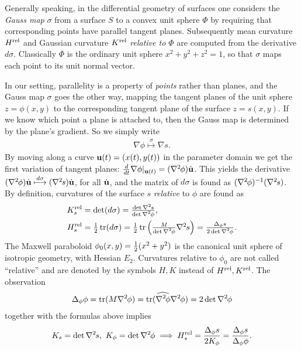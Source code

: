 \documentclass[review]{acmsiggraph}
\def\wh{\widehat}
\def\tr{\mathop{{\rm tr}}\nolimits}
\def\rel{{\mathord{{\rm rel}}}}
\def\ess{s}
\def\Hess#1{{\def\testess{#1}\nabla^2\ifx\testess\ess\!s\else #1\fi}}
\def\Hess#1{\text{$\nabla^2\hskip-.2ex #1$}}
\begin{document}
Generally speaking, in the differential geometry of surfaces one considers
the {\em Gauss map} $\sigma$ from a surface $S$ to a convex unit sphere
$\Phi$ by requiring that corresponding points have parallel tangent
planes.  Subsequently mean curvature $H^\rel$ and Gaussian curvature
$K^\rel$ {\em relative to $\Phi$} are computed from the derivative
$d\sigma$. Classically $\Phi$ is the ordinary unit sphere $x^2+y^2+z^2=1$,
so that $\sigma$ maps each point to its unit normal vector.



In our setting, parallelity is a property of {\em points} rather than
planes, and the Gauss map $\sigma$ goes the other way, mapping the tangent
planes of the unit sphere $z=\phi(x,y)$ to the corresponding tangent plane
of the surface $z=s(x,y)$. If we know which point a plane is attached to,
then the Gauss map is determined by the plane's gradient. So we simply write
	\begin{align*}
	\nabla \phi\overset\sigma\longmapsto\nabla s.
	\end{align*}
 By moving along a curve ${\mathbf u}(t)=(x(t),y(t))$ in the parameter domain we
get the first variation of tangent planes:
	$
	{d\over dt}\nabla \phi|_{\uw(t)} =
	(\Hess\phi)\dot\uw
	$.
 This yields the derivative
	$	
	(\Hess\phi)\dot\uw \overset{d\sigma}\longmapsto
	(\Hess s)\dot\uw $,
 for all $\dot{{\mathbf u}}$, and the matrix of $d\sigma$ is found as
$(\Hess\phi)^{-1}(\Hess s)$.  By definition, curvatures of the surface $s$
{\em relative} to $\phi$ are found as
	\begin{align*}
		K_s^\rel
	& = \textstyle
		\det(d\sigma) =
		{\det\Hess s \over \det\Hess\phi} ,
	\\
		H_s^\rel
	&= \textstyle
		{1\over 2}\tr(d\sigma)
		= {1\over 2}\tr \left({M\over\det\Hess\phi} \Hess s\right)
		=  {\Delta_\phi s \over 2\det\Hess\phi}.
	\end{align*}
 The Maxwell paraboloid $\phi_0(x,y)={1\over 2}(x^2+y^2)$ is the canonical
unit sphere of isotropic geometry, with Hessian $E_2$. Curvatures
relative to $\phi_0$ are not called ``relative'' and are denoted by the
symbols $H,K$ instead of $H^\rel,K^\rel$. The observation
	\begin{align*}
	\Delta_\phi \phi
	= \tr(M \Hess \phi)
	= \tr(\wh{\Hess\phi}\Hess\phi)
	= 2\det\Hess\phi
	\end{align*}
 together with the formulas above implies
	\begin{align*}
		K_s  = \det \Hess s,
	\
		K_\phi = \det \Hess \phi
	\implies
		H_s^\rel =  {\Delta_\phi s \over 2 K_\phi}
			= {\Delta_\phi s\over \Delta_\phi \phi}.
	\end{align*}
\end{document}
